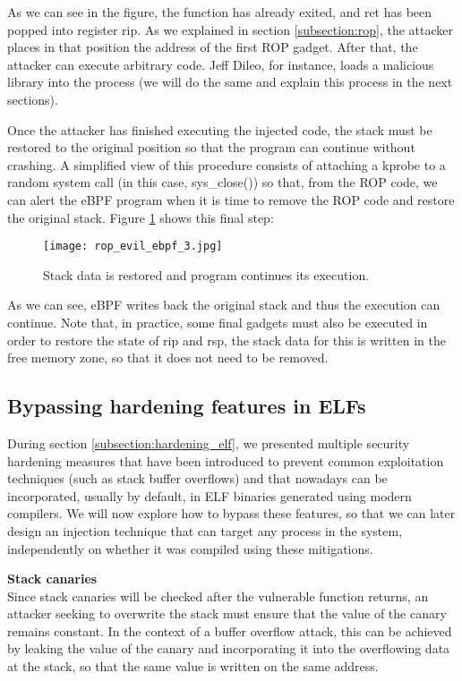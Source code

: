 As we can see in the figure, the function has already exited, and ret has been popped into register rip. As we explained in section \ref{subsection:rop}, the attacker places in that position the address of the first ROP gadget. After that, the attacker can execute arbitrary code. Jeff Dileo, for instance, loads a malicious library into the process (we will do the same and explain this process in the next sections).

Once the attacker has finished executing the injected code, the stack must be restored to the original position so that the program can continue without crashing. A simplified view of this procedure consists of attaching a kprobe to a random system call (in this case, sys\_close()) so that, from the ROP code, we can alert the eBPF program when it is time to remove the ROP code and restore the original stack. Figure \ref{fig:rop_evil_ebpf_3} shows this final step:

\begin{figure}[H]
	\centering
	\texttt{[image: rop\_evil\_ebpf\_3.jpg]}
	\caption{Stack data is restored and program continues its execution.}
	\label{fig:rop_evil_ebpf_3}
\end{figure}

As we can see, eBPF writes back the original stack and thus the execution can continue. Note that, in practice, some final gadgets must also be executed in order to restore the state of rip and rsp, the stack data for this is written in the free memory zone, so that it does not need to be removed.


\subsection{Bypassing hardening features in ELFs}
During section \ref{subsection:hardening_elf}, we presented multiple  security hardening measures that have been introduced to prevent common exploitation techniques (such as stack buffer overflows) and that nowadays can be incorporated, usually by default, in ELF binaries generated using modern compilers. We will now explore how to bypass these features, so that we can later design an injection technique that can target any process in the system, independently on whether it was compiled using these mitigations.

\textbf{Stack canaries}\\
Since stack canaries will be checked after the vulnerable function returns, an attacker seeking to overwrite the stack must ensure that the value of the canary remains constant. In the context of a buffer overflow attack, this can be achieved by leaking the value of the canary and incorporating it into the overflowing data at the stack, so that the same value is written on the same address\cite{canary_exploit}.

